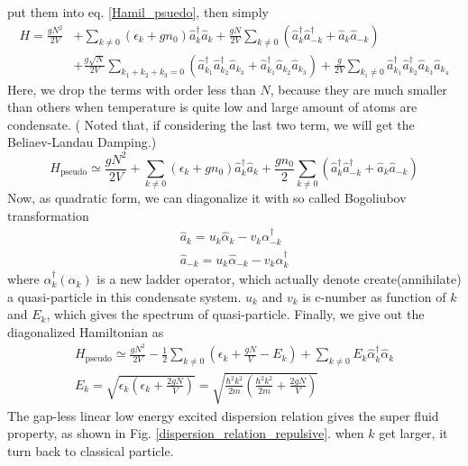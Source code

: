 put them into eq. \ref{Hamil_psuedo}, then simply
\begin{equation}
\begin{split}
H=\frac{g N^2}{2V}&+\sum_{k\neq0}\left(\epsilon_k+gn_0\right)\hat{a}_k^\dagger\hat{a}_k+\frac{gN}{2V}\sum_{k\neq0}\left(\hat{a}_k^\dagger\hat{a}_{-k}^\dagger+\hat{a}_k\hat{a}_{-k}\right)\\
&+\frac{g\sqrt{N}}{2V}\sum_{k_1+k_2+k_3=0}\left(\hat{a}_{k_1}^\dagger\hat{a}_{k_2}^\dagger\hat{a}_{k_3}+\hat{a}_{k_1}^\dagger\hat{a}_{k_2}\hat{a}_{k_3}\right)+\frac{g}{2V}\sum_{k_i\neq0}\hat{a}_{k_1}^\dagger\hat{a}_{k_2}^\dagger\hat{a}_{k_3}\hat{a}_{k_4}
\end{split}
\end{equation}
Here, we drop the terms with order less than $N$, because they are much smaller than others when temperature is quite low and  large amount of atoms are condensate. ( Noted that, if considering the last two term, we will get the Beliaev-Landau Damping.)
\begin{equation}
H_{\text{pseudo}}\simeq\frac{gN^2}{2V}+\sum_{k\neq0}\left(\epsilon _k+g n_0\right)\hat{a}_k^\dagger\hat{a}_k+\frac{gn_0}{2}\sum_{k\neq0}\left(\hat{a}_k^\dagger\hat{a}_{-k}^\dagger+\hat{a}_k\hat{a}_{-k}\right)\end{equation}
Now, as quadratic form, we can diagonalize it with so called Bogoliubov transformation
\begin{equation}
\begin{split}
\hat{a}_k=u_k\hat{\alpha }_k-v_k\alpha _{-k}^\dagger\\
\hat{a}_{-k}=u_k\hat{\alpha }_{-k}-v_k\alpha _k^\dagger
\end{split}
\end{equation}
where $\alpha _k^\dagger\left(\alpha _k\right)$ is a new ladder operator, which actually denote create(annihilate) a quasi-particle in this condensate system. $u_k$ and $v_k$ is c-number as function of $k$ and $E_k$, which gives the spectrum of quasi-particle. 
Finally, we give out the diagonalized Hamiltonian as
\begin{equation}
\label{Hamil_psuedo_dia}
\begin{split}
H_{\text{pseudo}}\simeq \frac{g N^2}{2V}-\frac{1}{2}\sum _{k\neq 0} \left(\epsilon _k+\frac{g N}{V}-E_k\right)+\sum _{k\neq 0} E_k\hat{\alpha }_k^\dagger\hat{\alpha
}_k\\
E_k=\sqrt{\epsilon _k\left(\epsilon _k+\frac{2 g N}{V}\right)}=\sqrt{\frac{\hbar ^2k^2}{2m}\left(\frac{\hbar ^2k^2}{2m}+\frac{2 g N}{V}\right)}
\end{split}
\end{equation}
The gap-less linear low energy excited dispersion relation gives the super fluid property, as shown in Fig. \ref{dispersion_relation_repulsive}. when $k$ get larger, it turn back to classical particle. 

